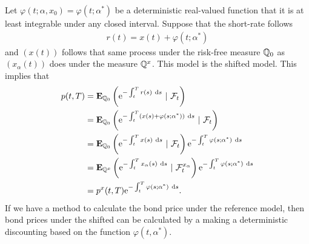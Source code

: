 Let $\varphi(t; \alpha, x_0) = \varphi(t; \alpha^*)$ be a deterministic real-valued function that it is at least integrable under any closed interval. Suppose that the short-rate follows
	\begin{align}
		r(t) = x(t) + \varphi(t; \alpha^*)
	\end{align}
and $(x(t))$ follows that same process under the risk-free measure $\mathbb{Q}_0$ as $(x_{\alpha}(t))$ does under the measure $\mathbb{Q}^x$. This model is the shifted model. This implies that
	\begin{align}
		\Bond(t,T) &= \E_{\Pm_0} \left( \e^{ - \int_t^T r(s) \ \dx s} \ | \ \F_t \right) \\
			&= \E_{\Pm_0} \left( \e^{ - \int_t^T (x(s) + \varphi(s; \alpha^*)) \ \dx s} \ | \ \F_t \right) \\
			&=  \E_{\Pm_0} \left( \e^{ - \int_t^T x(s)  \ \dx s} \ | \ \F_t \right) \e^{ - \int_t^T \varphi(s; \alpha^*) \ \dx s} \\
			&=  \E_{\Pm^x} \left( \e^{ - \int_t^T x_{\alpha}(s)  \ \dx s} \ | \ \F_t^{x_{\alpha}} \right) \e^{ - \int_t^T \varphi(s; \alpha^*) \ \dx s} \\
			&= \Bond^x(t,T) \e^{ - \int_t^T \varphi(s; \alpha^*) \ \dx s} .
	\end{align}
If we have a method to calculate the bond price under the reference model, then bond prices under the shifted can be calculated by a making a deterministic discounting based on the function $\varphi(t, \alpha^*)$.

